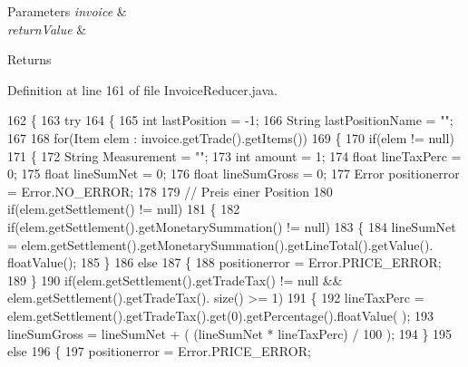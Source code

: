 \begin{DoxyParams}{Parameters}
{\em invoice} & \\
\hline
{\em return\+Value} & \\
\hline
\end{DoxyParams}
\begin{DoxyReturn}{Returns}

\end{DoxyReturn}


Definition at line 161 of file Invoice\+Reducer.\+java.


\begin{DoxyCode}
162     \{
163         \textcolor{keywordflow}{try}
164         \{
165         \textcolor{keywordtype}{int} lastPosition = -1;
166         String lastPositionName = \textcolor{stringliteral}{""};
167         
168         \textcolor{keywordflow}{for}(Item elem : invoice.getTrade().getItems())
169         \{
170             \textcolor{keywordflow}{if}(elem != null)
171             \{
172                 String Measurement = \textcolor{stringliteral}{""};
173                 \textcolor{keywordtype}{int} amount = 1;
174                 \textcolor{keywordtype}{float} lineTaxPerc = 0;
175                 \textcolor{keywordtype}{float} lineSumNet = 0;
176                 \textcolor{keywordtype}{float} lineSumGross = 0;
177                 Error positionerror = Error.NO\_ERROR;
178                 
179                 \textcolor{comment}{// Preis einer Position}
180                 \textcolor{keywordflow}{if}(elem.getSettlement() != null)
181                 \{
182                     \textcolor{keywordflow}{if}(elem.getSettlement().getMonetarySummation() != null)
183                     \{
184                         lineSumNet = elem.getSettlement().getMonetarySummation().getLineTotal().getValue().
      floatValue();
185                     \}
186                     \textcolor{keywordflow}{else}
187                     \{
188                         positionerror = Error.PRICE\_ERROR;
189                     \}
190                     \textcolor{keywordflow}{if}(elem.getSettlement().getTradeTax() != null  && elem.getSettlement().getTradeTax().
      size() >= 1)
191                     \{
192                         lineTaxPerc = elem.getSettlement().getTradeTax().get(0).getPercentage().floatValue(
      );
193                         lineSumGross = lineSumNet + ( (lineSumNet * lineTaxPerc) / 100 );
194                     \}
195                     \textcolor{keywordflow}{else}
196                     \{
197                         positionerror = Error.PRICE\_ERROR;

\end{DoxyCode}
